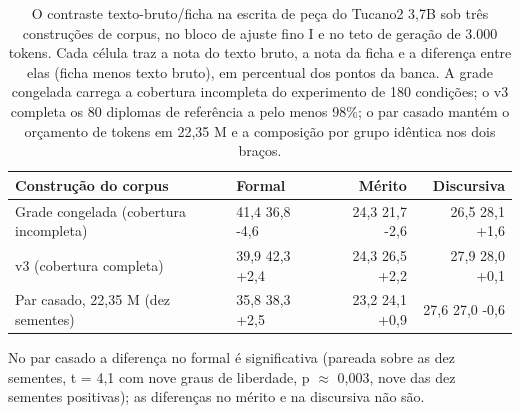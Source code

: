 \documentclass{IOS-Book-Article}
\begin{document}
\begin{table}[!ht]
\centering
\caption{O contraste texto-bruto/ficha na escrita de peça do Tucano2 3,7B sob três construções de corpus, no bloco de ajuste fino I e no teto de geração de 3.000 tokens. Cada célula traz a nota do texto bruto, a nota da ficha e a diferença entre elas (ficha menos texto bruto), em percentual dos pontos da banca. A grade congelada carrega a cobertura incompleta do experimento de 180 condições; o v3 completa os 80 diplomas de referência a pelo menos 98\%; o par casado mantém o orçamento de tokens em 22,35 M e a composição por grupo idêntica nos dois braços.}
\footnotesize\setlength{\tabcolsep}{3pt}
\begin{tabular}{llrr}
\hline
\textbf{Construção do corpus} & \textbf{Formal} & \textbf{Mérito} & \textbf{Discursiva} \\
\hline
Grade congelada (cobertura incompleta) & 41,4 \textperiodcentered{} 36,8 \textperiodcentered{} -4,6 & 24,3 \textperiodcentered{} 21,7 \textperiodcentered{} -2,6 & 26,5 \textperiodcentered{} 28,1 \textperiodcentered{} +1,6 \\
v3 (cobertura completa) & 39,9 \textperiodcentered{} 42,3 \textperiodcentered{} +2,4 & 24,3 \textperiodcentered{} 26,5 \textperiodcentered{} +2,2 & 27,9 \textperiodcentered{} 28,0 \textperiodcentered{} +0,1 \\
Par casado, 22,35 M (dez sementes) & 35,8 \textperiodcentered{} 38,3 \textperiodcentered{} +2,5 & 23,2 \textperiodcentered{} 24,1 \textperiodcentered{} +0,9 & 27,6 \textperiodcentered{} 27,0 \textperiodcentered{} -0,6 \\
\hline
\end{tabular}
\par\vspace{3pt}\begin{minipage}{\textwidth}\footnotesize No par casado a diferença no formal é significativa (pareada sobre as dez sementes, t = 4,1 com nove graus de liberdade, p $\approx$ 0,003, nove das dez sementes positivas); as diferenças no mérito e na discursiva não são.\end{minipage}
\end{table}
\end{document}
